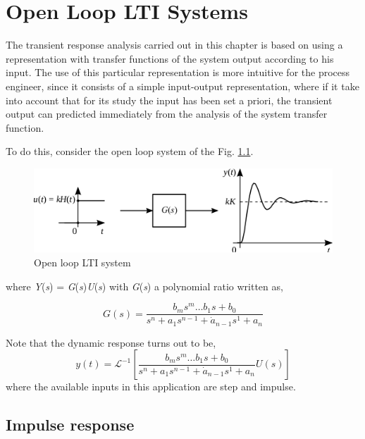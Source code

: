 
\chapter{Open Loop LTI Systems} \label{LA_chapter}

The transient response analysis carried out in this chapter is based on using a representation with  transfer functions of the system output according to his input. The use of this particular representation is more intuitive for the process engineer, since it consists of a simple input-output representation, where if it take into account that for its study the input has been set a priori, the transient output can predicted immediately from the analysis of the system transfer function.

\vspace{0.4cm}
To do this, consider the open loop system of the Fig. \ref{chp_la_fig01_la}.

\begin{figure}[H]
	\centering
	\includegraphics[scale=1.2]{./figuras/chapter_gla/fig_la.png}
	\caption{Open loop LTI system}
	\label{chp_la_fig01_la}
\end{figure}
where \textit{Y}(\textit{s}) = \textit{G}(\textit{s})\textit{U}(\textit{s}) with \textit{G}(\textit{s}) a polynomial ratio written as,

\begin{equation}\label{eqn01_chp_la}
	G(s)=\frac{b_m s^m \dots b_1 s + b_0}{s^n+a_1s^{n-1}+\dot a_{n-1}s^1 + a_n}
\end{equation}

Note that the dynamic response turns out to be,
\begin{equation}\label{eqn02_chp_la}
	y(t)= \mathscr{L}^{-1} \left[ \frac{b_m s^m \dots b_1 s + b_0}{s^n+a_1s^{n-1}+\dot a_{n-1}s^1 + a_n} U(s)\right]
\end{equation}
where the available inputs in this application are step and impulse.


\section{Impulse response}

